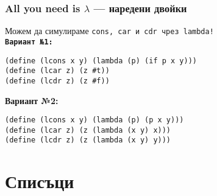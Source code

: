 \documentclass{beamer}
\begin{document}
\begin{comment}
\begin{frame}
  \frametitle{S-изрази}

  \begin{definition}
    S-израз наричаме:
    \begin{itemize}
    \item атоми (булеви, числа, знаци, символи, низове, функции)
    \item наредени двойки \tt{(S$_1$ . S$_2$)}, където \tt{S$_1$} и \tt{S$_2$} са S-изрази
    \end{itemize}
  \end{definition}
  \vspace{1em}
  \pause
  \alert{S-изразите са най-общият тип данни в Scheme.}\\[1em]
  С тяхна помощ могат да се дефинират произволно сложни структури от данни.
\end{frame}
\end{comment}
\begin{frame}[fragile]
  \frametitle{All you need is $\lambda$ --- наредени двойки}

  Можем да симулираме \tt{cons}, \tt{car} и \tt{cdr} чрез \tt{lambda}!\\[1em]
  \pause
  \textbf{Вариант №1:}
\begin{lstlisting}
(define (lcons x y) (lambda (p) (if p x y)))
(define (lcar z) (z #t))
(define (lcdr z) (z #f))
\end{lstlisting}
  \pause
  \textbf{Вариант №2:}
\begin{lstlisting}
(define (lcons x y) (lambda (p) (p x y)))
(define (lcar z) (z (lambda (x y) x)))
(define (lcdr z) (z (lambda (x y) y)))
\end{lstlisting}
\end{frame}

\section{Списъци}
\end{document}
